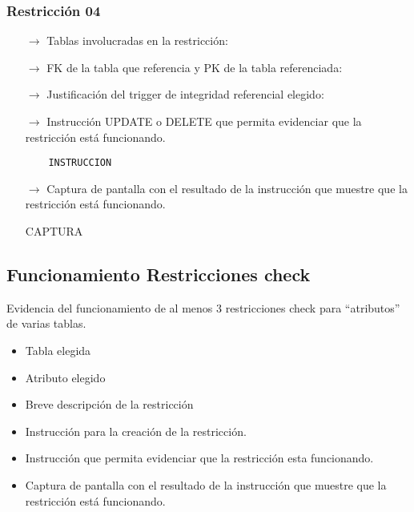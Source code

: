 \subsubsection*{Restricción 04}

\begin{itemize}
    \item[$\rightarrow$] Tablas involucradas en la restricción: 
    \item[$\rightarrow$] FK de la tabla que referencia y PK de la tabla referenciada: 
    \item[$\rightarrow$] Justificación del trigger de integridad referencial elegido: 
    \item[$\rightarrow$] Instrucción UPDATE o DELETE que permita evidenciar que la restricción está
    funcionando.
    \begin{verbatim}
    INSTRUCCION
    \end{verbatim}
    \item[$\rightarrow$] Captura de pantalla con el resultado de la instrucción que muestre que la restricción está
    funcionando.
    \begin{center}
        CAPTURA
    \end{center}
\end{itemize}


\subsection{Funcionamiento Restricciones check}

Evidencia del funcionamiento de al menos 3 restricciones check para “atributos” de varias
tablas.

\begin{itemize}
    \item Tabla elegida
    \item Atributo elegido
    \item Breve descripción de la restricción
    \item Instrucción para la creación de la restricción.
    \item Instrucción que permita evidenciar que la restricción esta funcionando.
    \item Captura de pantalla con el resultado de la instrucción que muestre que la restricción está
    funcionando.
\end{itemize}




